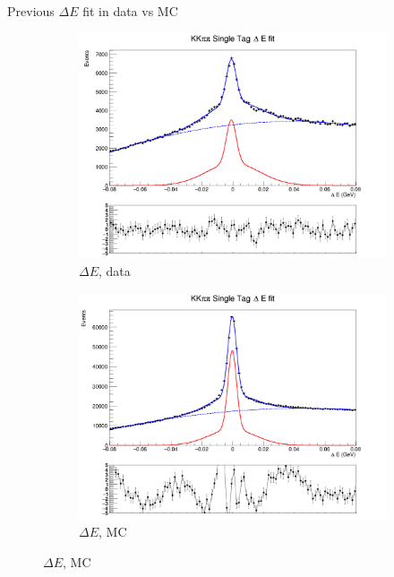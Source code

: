 \documentclass{beamer}
\begin{document}
\begin{frame}{Previous $\Delta E$ fit in data vs MC}
  \begin{figure}
    \centering
    \begin{subfigure}{0.5\textwidth}
      \centering
      \includegraphics[width=\textwidth]{KKpipiSingleTagDeltaEPlotDataOld.png}
      \caption{$\Delta E$, data}
    \end{subfigure}%
    \begin{subfigure}{0.5\textwidth}
      \centering
      \includegraphics[width=\textwidth]{KKpipiSingleTagDeltaEPlotMCOld.png}
      \caption{$\Delta E$, MC}
    \end{subfigure}
  \end{figure}
\end{frame}
\end{document}
